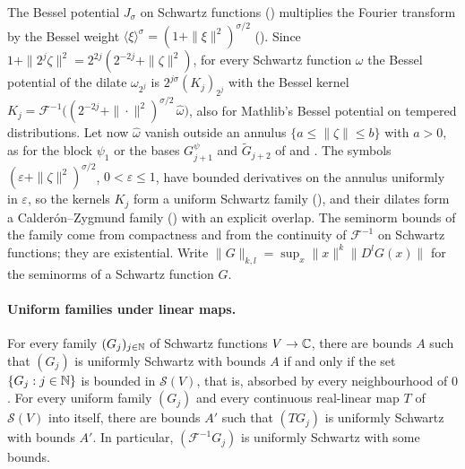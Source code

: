 The Bessel potential $J_\sigma$ on Schwartz functions () multiplies
the Fourier transform by the Bessel weight
$\langle \xi \rangle^\sigma = (1 + \|\xi\|^2)^{\sigma/2}$ (). Since
$1 + \|2^j \zeta\|^2 = 2^{2j} (2^{-2j} + \|\zeta\|^2)$, for every Schwartz function $\omega$ the
Bessel potential of the dilate $\omega_{2^j}$ is $2^{j\sigma} (K_j)_{2^j}$ with the Bessel kernel
$K_j = \mathcal F^{-1} \bigl( (2^{-2j} + \|\cdot\|^2)^{\sigma/2} \, \widehat\omega \bigr)$, also
for Mathlib's Bessel potential on tempered distributions. Let now $\widehat\omega$ vanish outside
an annulus $\{a \leq \|\zeta\| \leq b\}$ with $a > 0$, as for the block $\psi_1$ or the bases
$G^{\psi}_{j+1}$ and $\tilde G_{j+2}$ of  and . The
symbols $(\varepsilon + \|\zeta\|^2)^{\sigma/2}$, $0 < \varepsilon \leq 1$, have bounded
derivatives on the annulus uniformly in $\varepsilon$, so the kernels $K_j$ form a uniform
Schwartz family (), and their dilates form a Calder\'on--Zygmund family
() with an explicit overlap. The seminorm bounds of the family come from
compactness and from the continuity of $\mathcal F^{-1}$ on Schwartz functions; they are
existential. Write $\|G\|_{k,l} = \sup_x \|x\|^k \|D^l G(x)\|$ for the seminorms of a Schwartz
function $G$.

\paragraph{Uniform families under linear maps.}

\begin{theorem}
\label{thm:uniform-schwartz-linear-map}
\leanok
{}
For every family $(G_j)_{j \in \mathbb{N}}$ of Schwartz functions $V \to \mathbb{C}$, there are bounds $A$ such
that $(G_j)$ is uniformly Schwartz with bounds $A$ if and only if the set
$\{G_j : j \in \mathbb{N}\}$ is bounded in $\mathcal S(V)$, that is, absorbed by every neighbourhood of
$0$. For every uniform family $(G_j)$ and every continuous real-linear map $T$ of
$\mathcal S(V)$ into itself, there are bounds $A'$ such that $(T G_j)$ is uniformly Schwartz with
bounds $A'$. In particular, $(\mathcal F^{-1} G_j)$ is uniformly Schwartz with some bounds.
\end{theorem}

